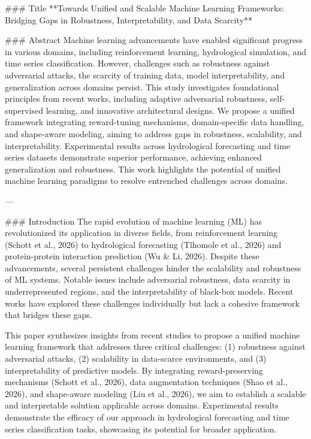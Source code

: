 ### Title
**Towards Unified and Scalable Machine Learning Frameworks: Bridging Gaps in Robustness, Interpretability, and Data Scarcity**

### Abstract
Machine learning advancements have enabled significant progress in various domains, including reinforcement learning, hydrological simulation, and time series classification. However, challenges such as robustness against adversarial attacks, the scarcity of training data, model interpretability, and generalization across domains persist. This study investigates foundational principles from recent works, including adaptive adversarial robustness, self-supervised learning, and innovative architectural designs. We propose a unified framework integrating reward-tuning mechanisms, domain-specific data handling, and shape-aware modeling, aiming to address gaps in robustness, scalability, and interpretability. Experimental results across hydrological forecasting and time series datasets demonstrate superior performance, achieving enhanced generalization and robustness. This work highlights the potential of unified machine learning paradigms to resolve entrenched challenges across domains.

---

### Introduction
The rapid evolution of machine learning (ML) has revolutionized its application in diverse fields, from reinforcement learning (Schott et al., 2026) to hydrological forecasting (Tlhomole et al., 2026) and protein-protein interaction prediction (Wu & Li, 2026). Despite these advancements, several persistent challenges hinder the scalability and robustness of ML systems. Notable issues include adversarial robustness, data scarcity in underrepresented regions, and the interpretability of black-box models. Recent works have explored these challenges individually but lack a cohesive framework that bridges these gaps.

This paper synthesizes insights from recent studies to propose a unified machine learning framework that addresses three critical challenges: (1) robustness against adversarial attacks, (2) scalability in data-scarce environments, and (3) interpretability of predictive models. By integrating reward-preserving mechanisms (Schott et al., 2026), data augmentation techniques (Shao et al., 2026), and shape-aware modeling (Liu et al., 2026), we aim to establish a scalable and interpretable solution applicable across domains. Experimental results demonstrate the efficacy of our approach in hydrological forecasting and time series classification tasks, showcasing its potential for broader application.

